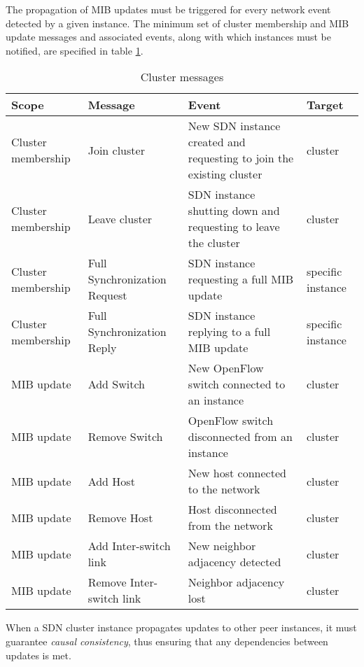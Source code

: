 The propagation of \gls{MIB} updates must be triggered for every network event detected by a given instance.
The minimum set of cluster membership and \gls{MIB} update messages and associated events, along with which instances must be notified, are specified in table \ref{table:cluster-message-spec}.
%
\begin{table}[h!]
	\begin{center}
		\begin{tabular}{ | l | p{} | p{6cm} | p{} | }
			\rowcolor{HeaderRowColor}
			\hline
			\textbf{Scope} & \textbf{Message} & \textbf{Event} & \textbf{Target}\\
			\hline
			Cluster membership & Join cluster & New \gls{SDN} instance created and requesting to join the existing cluster & cluster\\
			\hline
			Cluster membership & Leave cluster & \gls{SDN} instance shutting down and requesting to leave the cluster & cluster\\
			\hline
			Cluster membership & Full Synchronization Request & \gls{SDN} instance requesting a full \gls{MIB} update & specific instance\\
			\hline
			Cluster membership & Full Synchronization Reply & \gls{SDN} instance replying to a full \gls{MIB} update & specific instance\\
			\hline
			\gls{MIB} update & Add Switch & New OpenFlow switch connected to an instance & cluster\\
			\hline
			\gls{MIB} update & Remove Switch & OpenFlow switch disconnected from an instance & cluster\\
			\hline
			\gls{MIB} update & Add Host & New host connected to the network & cluster\\
			\hline
			\gls{MIB} update & Remove Host & Host disconnected from the network & cluster\\
			\hline
			\gls{MIB} update & Add Inter-switch link & New neighbor adjacency detected & cluster\\
			\hline
			\gls{MIB} update & Remove Inter-switch link & Neighbor adjacency lost & cluster\\
			\hline
		\end{tabular}
		\caption{Cluster messages}
		\label{table:cluster-message-spec}
	\end{center}
\end{table}
%
When a \gls{SDN} cluster instance propagates updates to other peer instances, it must guarantee \emph{causal consistency}, thus ensuring that any dependencies between updates is met.
